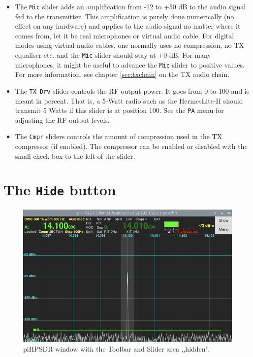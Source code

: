 \documentclass[12pt]{book}
\def\rett#1{\texttt{\color{red}#1}}
\def\bltt#1{\texttt{\color{blue}#1}}
\def\pH{pi\-HPSDR\xspace}
\begin{document}
\begin{itemize}
\item{
The \rett{Mic} slider adds an amplification from -12 to +50 dB to the audio signal fed to the transmitter.
This amplification is purely done numerically (no effect on any hardware) and applies to the audio signal
no matter where it comes from, let it be real microphones or virtual audio cable. For digital modes using
virtual audio cables, one normally uses no compression, no TX equaliser etc. and the \rett{Mic} slider
should stay at +0 dB. For many microphones, it might be useful to advance the \rett{Mic} slider
to positive values. For more information, see chapter \ref{sec:txchain} on the TX audio chain.}

\item{
The \rett{TX Drv} slider controls the RF output power. It goes from 0 to 100 and is meant in percent. That is,
a 5-Watt radio such as the HermesLite-II should transmit 5 Watts if this slider is at position 100. See the
\bltt{PA} menu for adjusting the RF output levels.}

\item{
The \rett{Cmpr} sliders controls the amount of compression used in the TX compressor (if enabled).
The compressor can be enabled or disabled with the small check box to the left of the slider.
}
\end{itemize}
\section{The \texttt{Hide} button}
\begin{figure}[ht]
\center
\includegraphics[scale=0.35]{Hidden.png}
\caption{\pH window with the Toolbar and Slider
area ,,hidden''.}
\end{figure}
\end{document}
